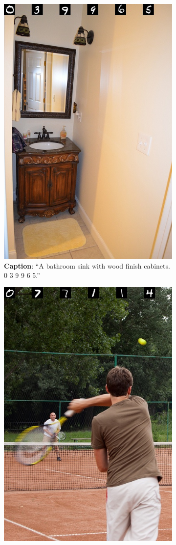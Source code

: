 \begin{figure}[t!]
	\centering
	\begin{subfigure}[b]{0.475\textwidth}
		\centering
		\includegraphics[width=\textwidth, height=\textwidth]{figures/shortcut_examples/shortcut_img1.jpg}
		\caption{\textbf{Caption}: ``A bathroom sink with wood finish cabinets.  0 3 9 9 6 5.''}%
		\label{fig:shortcut1}
	\end{subfigure}
	\hfill
	\begin{subfigure}[b]{0.475\textwidth}  
		\centering 
		\includegraphics[width=\textwidth, height=\textwidth]{figures/shortcut_examples/shortcut_img2.jpg}

\end{subfigure}
\end{figure}
